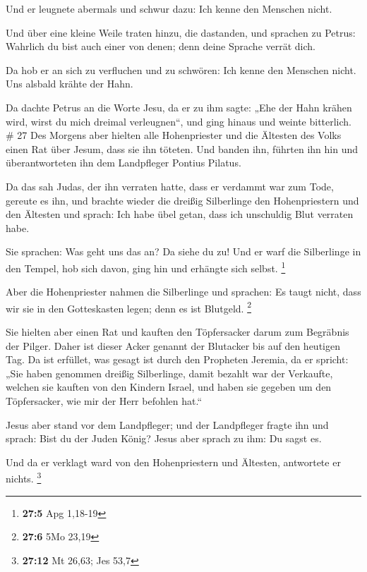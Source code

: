  Und er leugnete abermals und schwur dazu: Ich kenne den
Menschen nicht.

 Und über eine kleine Weile traten hinzu, die dastanden,
und sprachen zu Petrus: Wahrlich du bist auch einer von denen; denn
deine Sprache verrät dich.

 Da hob er an sich zu verfluchen und zu schwören: Ich kenne
den Menschen nicht. Uns alsbald krähte der Hahn.

 Da dachte Petrus an die Worte Jesu, da er zu ihm sagte:
„Ehe der Hahn krähen wird, wirst du mich dreimal verleugnen``, und ging
hinaus und weinte bitterlich. \# 27  Des Morgens aber
hielten alle Hohenpriester und die Ältesten des Volks einen Rat über
Jesum, dass sie ihn töteten.  Und banden ihn, führten ihn
hin und überantworteten ihn dem Landpfleger Pontius Pilatus.

 Da das sah Judas, der ihn verraten hatte, dass er verdammt
war zum Tode, gereute es ihn, und brachte wieder die dreißig Silberlinge
den Hohenpriestern und den Ältesten  und sprach: Ich habe
übel getan, dass ich unschuldig Blut verraten habe.

 Sie sprachen: Was geht uns das an? Da siehe du zu! Und er
warf die Silberlinge in den Tempel, hob sich davon, ging hin und
erhängte sich selbst. \footnote{\textbf{27:5} Apg 1,18-19}

 Aber die Hohenpriester nahmen die Silberlinge und sprachen:
Es taugt nicht, dass wir sie in den Gotteskasten legen; denn es ist
Blutgeld. \footnote{\textbf{27:6} 5Mo 23,19}

 Sie hielten aber einen Rat und kauften den Töpfersacker
darum zum Begräbnis der Pilger.  Daher ist dieser Acker
genannt der Blutacker bis auf den heutigen Tag.  Da ist
erfüllet, was gesagt ist durch den Propheten Jeremia, da er spricht:
„Sie haben genommen dreißig Silberlinge, damit bezahlt war der
Verkaufte, welchen sie kauften von den Kindern Israel,  und
haben sie gegeben um den Töpfersacker, wie mir der Herr befohlen hat.``

 Jesus aber stand vor dem Landpfleger; und der Landpfleger
fragte ihn und sprach: Bist du der Juden König? Jesus aber sprach zu
ihm: Du sagst es.

 Und da er verklagt ward von den Hohenpriestern und
Ältesten, antwortete er nichts. \footnote{\textbf{27:12} Mt 26,63; Jes
  53,7}

